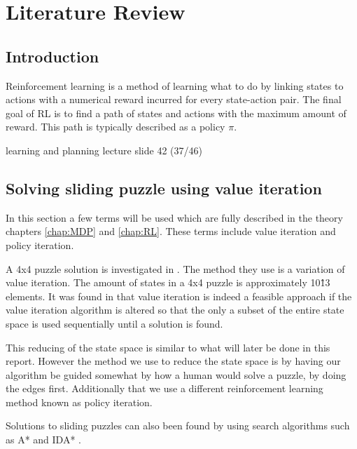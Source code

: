 \graphicspath{{Literature\_Review/fig}}
\chapter{Literature Review}
\label{chap:Literature_Review}

\section{Introduction}
Reinforcement learning is a method of learning what to do by linking states to actions with a numerical reward incurred for every state-action pair. The final goal of RL is to find a path of states and actions with the maximum amount of reward. \cite{sutton_barto} This path is typically described as a policy $\pi$.

{\color{red} learning and planning lecture slide 42 (37/46)}


\section{Solving sliding puzzle using value iteration}
In this section a few terms will be used which are fully described in the theory chapters \ref{chap:MDP} and \ref{chap:RL}. These terms include value iteration and policy iteration.

A 4x4 puzzle solution is investigated in \cite{15-puzzle_value_iteration}.
The method they use is a variation of value iteration. The amount of states in a 4x4 puzzle is approximately 10\^13 elements.
It was found in \cite{15-puzzle_value_iteration} that value iteration is indeed a feasible approach if the value iteration algorithm is altered so that the only a subset of the entire state space is used sequentially until a solution is found. 

This reducing of the state space is similar to what will later be done in this report. However the method we use to reduce the state space is by having our algorithm be guided somewhat by how a human would solve a puzzle, by doing the edges first. Additionally that we use a different reinforcement learning method known as policy iteration.


Solutions to sliding puzzles can also been found by using search algorithms such as A* and IDA*
\cite{search_alg}.
